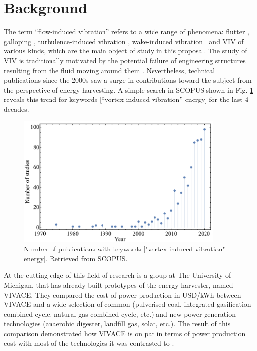 \documentclass[oneside]{utmthesis}
\begin{document}
\section{Background}
The term “flow-induced vibration” refers to a wide range of phenomena: flutter \citep{Doare2011,Xia2015a,Xia2015b}, galloping \citep{Kluger2013,Barrero-Gil2010,Luo2003,Chen2012}, turbulence-induced vibration \citep{Nakamura2013}, wake-induced vibration \citep{Ogink2010,Bearman2011,Derakhshandeh2014}, and VIV of various kinds, which are the main object of study in this proposal. The study of VIV is traditionally motivated by the potential failure of engineering structures resulting from the fluid moving around them \citep{Shiraishi1988,Nakamura1986,Larsen1997,Khalak1999}. Nevertheless, technical publications since the 2000s saw a surge in contributions toward the subject from the perspective of energy harvesting. A simple search in SCOPUS shown in Fig. \ref{fig:scopusTrend} reveals this trend for keywords [“vortex induced vibration” energy] for the last 4 decades.

\begin{figure}
  \centering
  \includegraphics[width=0.9\textwidth]{figs/scopusTrend}
  \caption{Number of publications with keywords ["vortex induced vibration" energy]. Retrieved from SCOPUS.}
  \label{fig:scopusTrend}
\end{figure}

At the cutting edge of this field of research is a group at The University of Michigan, that has already built prototypes of the energy harvester, named VIVACE. They compared the cost of power production in USD/kWh between VIVACE and a wide selection of common (pulverised coal, integrated gasification combined cycle, natural gas combined cycle, etc.) and new power generation technologies (anaerobic digester, landfill gas, solar, etc.). The result of this comparison demonstrated how VIVACE is on par in terms of power production cost with most of the technologies it was contrasted to \citet{Bernitsas2008a}.
\end{document}
